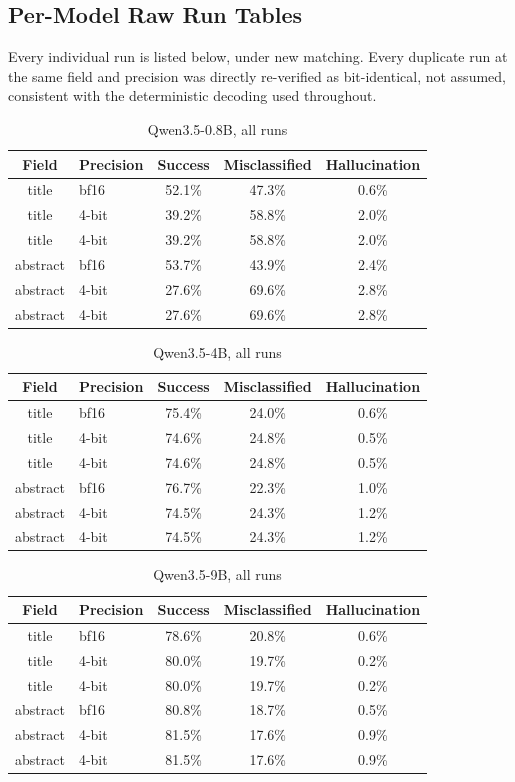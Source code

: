 \subsection{Per-Model Raw Run Tables}

Every individual run is listed below, under new matching. Every duplicate run at the same field and precision was directly re-verified as bit-identical, not assumed, consistent with the deterministic decoding used throughout.

\begin{table}[h]
\centering
\caption{Qwen3.5-0.8B, all runs}
\begin{tabular}{clccc}
\toprule
Field & Precision & Success & Misclassified & Hallucination \\
\midrule
title & bf16 & 52.1\% & 47.3\% & 0.6\% \\
title & 4-bit & 39.2\% & 58.8\% & 2.0\% \\
title & 4-bit & 39.2\% & 58.8\% & 2.0\% \\
abstract & bf16 & 53.7\% & 43.9\% & 2.4\% \\
abstract & 4-bit & 27.6\% & 69.6\% & 2.8\% \\
abstract & 4-bit & 27.6\% & 69.6\% & 2.8\% \\
\bottomrule
\end{tabular}
\end{table}

\begin{table}[h]
\centering
\caption{Qwen3.5-4B, all runs}
\begin{tabular}{clccc}
\toprule
Field & Precision & Success & Misclassified & Hallucination \\
\midrule
title & bf16 & 75.4\% & 24.0\% & 0.6\% \\
title & 4-bit & 74.6\% & 24.8\% & 0.5\% \\
title & 4-bit & 74.6\% & 24.8\% & 0.5\% \\
abstract & bf16 & 76.7\% & 22.3\% & 1.0\% \\
abstract & 4-bit & 74.5\% & 24.3\% & 1.2\% \\
abstract & 4-bit & 74.5\% & 24.3\% & 1.2\% \\
\bottomrule
\end{tabular}
\end{table}

\begin{table}[h]
\centering
\caption{Qwen3.5-9B, all runs}
\begin{tabular}{clccc}
\toprule
Field & Precision & Success & Misclassified & Hallucination \\
\midrule
title & bf16 & 78.6\% & 20.8\% & 0.6\% \\
title & 4-bit & 80.0\% & 19.7\% & 0.2\% \\
title & 4-bit & 80.0\% & 19.7\% & 0.2\% \\
abstract & bf16 & 80.8\% & 18.7\% & 0.5\% \\
abstract & 4-bit & 81.5\% & 17.6\% & 0.9\% \\
abstract & 4-bit & 81.5\% & 17.6\% & 0.9\% \\
\bottomrule
\end{tabular}
\end{table}

